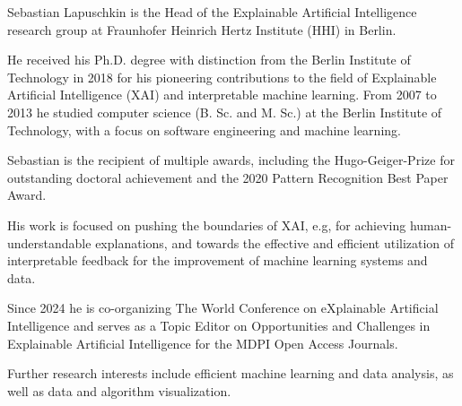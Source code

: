 
\vspace{-1.3em} %

\begin{multicols}{2}  %
\noindent

Sebastian Lapuschkin is the Head of the Explainable Artificial Intelligence research group at Fraunhofer Heinrich Hertz Institute (HHI) in Berlin.

He received his Ph.D. degree with distinction from the Berlin Institute of Technology in 2018
for his pioneering contributions to the field of Explainable Artificial Intelligence (XAI) and interpretable machine learning.
From 2007 to 2013 he studied computer science (B. Sc. and M. Sc.) at the Berlin Institute of Technology,
with a focus on software engineering and machine learning.

Sebastian is the recipient of multiple awards, including the Hugo-Geiger-Prize for outstanding doctoral achievement and the 2020 Pattern Recognition Best Paper Award.

His work is focused on pushing the boundaries of XAI, e.g, for achieving human-understandable explanations,
and towards the effective and efficient utilization of interpretable feedback for the improvement of machine learning systems and data.

Since 2024 he is co-organizing The World Conference on eXplainable Artificial Intelligence and serves as a Topic Editor on Opportunities and Challenges in Explainable Artificial Intelligence for the MDPI Open Access Journals.

Further research interests include efficient machine learning and data analysis, as well as data and algorithm visualization.

\end{multicols}